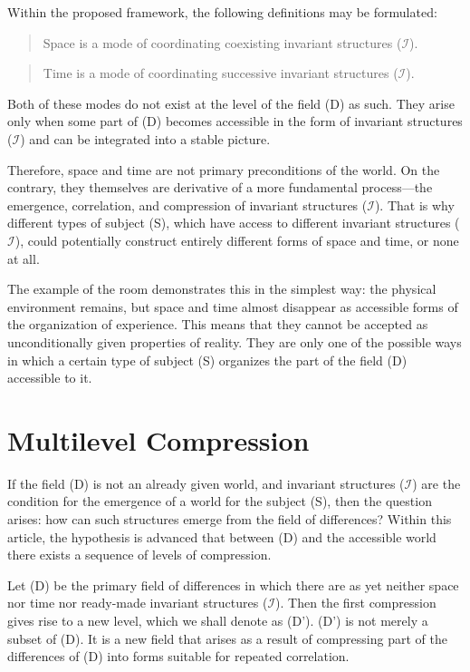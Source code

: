 \documentclass[aps,prd,onecolumn,nofootinbib,superscriptaddress]{revtex4-2}
\begin{document}
Within the proposed framework, the following definitions may be formulated:

\begin{quote}
Space is a mode of coordinating coexisting invariant structures ($\mathcal{I}$).
\end{quote}

\begin{quote}
Time is a mode of coordinating successive invariant structures ($\mathcal{I}$).
\end{quote}

Both of these modes do not exist at the level of the field (D) as such. They arise only when some part of (D) becomes accessible in the form of invariant structures ($\mathcal{I}$) and can be integrated into a stable picture.

Therefore, space and time are not primary preconditions of the world. On the contrary, they themselves are derivative of a more fundamental process—the emergence, correlation, and compression of invariant structures ($\mathcal{I}$). That is why different types of subject (S), which have access to different invariant structures ($\mathcal{I}$), could potentially construct entirely different forms of space and time, or none at all.

The example of the room demonstrates this in the simplest way: the physical environment remains, but space and time almost disappear as accessible forms of the organization of experience. This means that they cannot be accepted as unconditionally given properties of reality. They are only one of the possible ways in which a certain type of subject (S) organizes the part of the field (D) accessible to it.

\section{Multilevel Compression}
If the field (D) is not an already given world, and invariant structures ($\mathcal{I}$) are the condition for the emergence of a world for the subject (S), then the question arises: how can such structures emerge from the field of differences? Within this article, the hypothesis is advanced that between (D) and the accessible world there exists a sequence of levels of compression.

Let (D) be the primary field of differences in which there are as yet neither space nor time nor ready-made invariant structures ($\mathcal{I}$). Then the first compression gives rise to a new level, which we shall denote as (D'). (D') is not merely a subset of (D). It is a new field that arises as a result of compressing part of the differences of (D) into forms suitable for repeated correlation.
\end{document}

